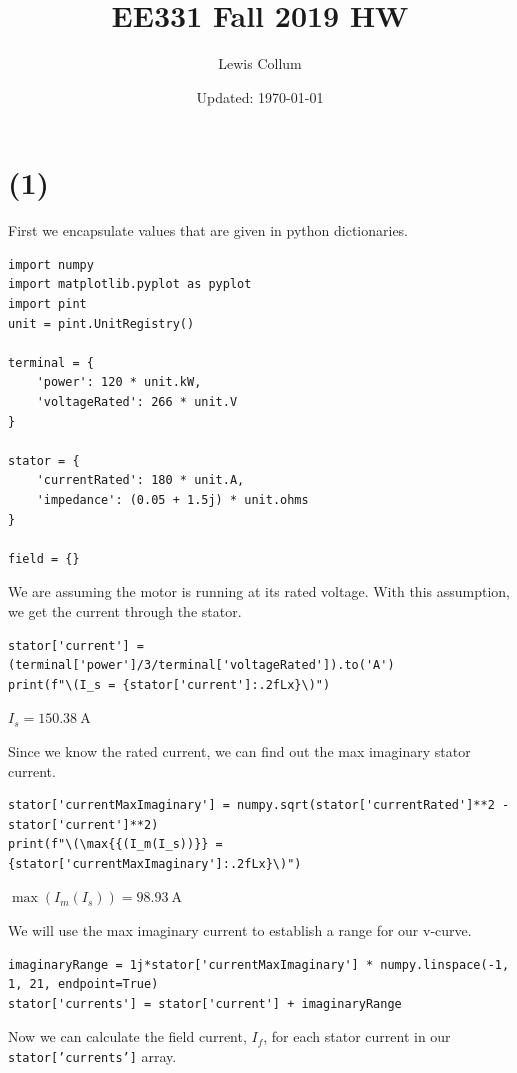\documentclass[fleqn]{article}
\author{Lewis Collum}
\date{Updated: \today}
\title{EE331 Fall 2019 HW \jobname}
\begin{document}
\maketitle

\section*{(1)}
\label{sec:org2d956c3}
First we encapsulate values that are given in python
dictionaries. 
\begin{verbatim}
import numpy
import matplotlib.pyplot as pyplot
import pint
unit = pint.UnitRegistry()

terminal = {
    'power': 120 * unit.kW,
    'voltageRated': 266 * unit.V
}

stator = {
    'currentRated': 180 * unit.A,
    'impedance': (0.05 + 1.5j) * unit.ohms
}

field = {}
\end{verbatim}

We are assuming the motor is running at its rated voltage. With this
assumption, we get the current through the stator.
\begin{verbatim}
stator['current'] = (terminal['power']/3/terminal['voltageRated']).to('A')
print(f"\(I_s = {stator['current']:.2fLx}\)")
\end{verbatim}

\(I_s = \SI[]{150.38}{\ampere}\)

Since we know the rated current, we can find out the max imaginary
stator current.
\begin{verbatim}
stator['currentMaxImaginary'] = numpy.sqrt(stator['currentRated']**2 - stator['current']**2)
print(f"\(\max{{(I_m(I_s))}} = {stator['currentMaxImaginary']:.2fLx}\)")
\end{verbatim}

\(\max{(I_m(I_s))} = \SI[]{98.93}{\ampere}\)

We will use the max imaginary current to establish a range for our
v-curve.
\begin{verbatim}
imaginaryRange = 1j*stator['currentMaxImaginary'] * numpy.linspace(-1, 1, 21, endpoint=True)
stator['currents'] = stator['current'] + imaginaryRange
\end{verbatim}

Now we can calculate the field current, \(I_f\), for each stator
current in our \texttt{stator['currents']} array.
\end{document}
